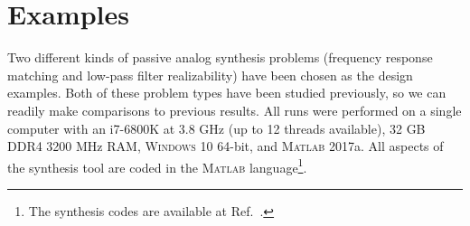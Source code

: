 \section{Examples\label{sec:ch6:examples}}

Two different kinds of passive analog synthesis problems (frequency response matching and low-pass filter realizability)
have been chosen as the design examples. 
Both of these problem types have been studied previously, so we can readily make comparisons to previous results.
All runs were performed on a single computer with an i7-6800K at 3.8 GHz (up to 12 threads available), 32 GB DDR4 3200 MHz RAM, \textsc{Windows} 10 64-bit, and \textsc{Matlab} 2017a.
All aspects of the synthesis tool are coded in the \textsc{Matlab} language\footnote{The synthesis codes are available at Ref.~\cite{github-pm-circuits}.}.



